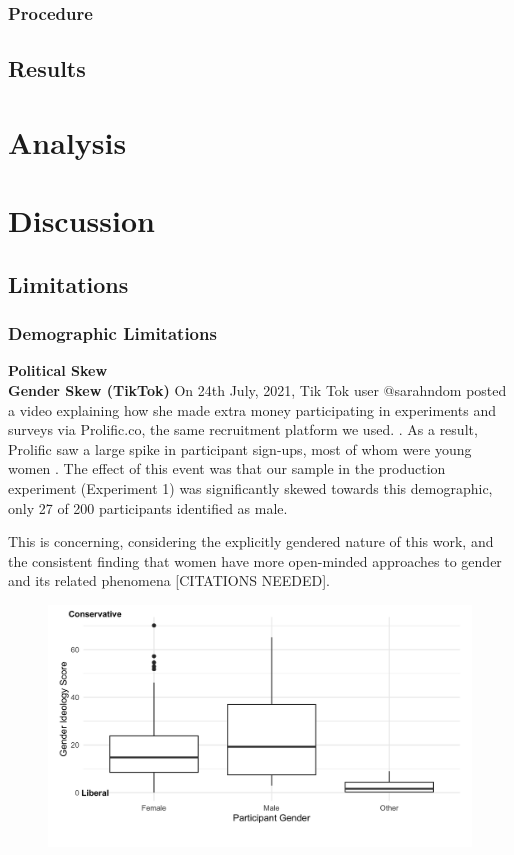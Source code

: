 \documentclass{article}
\begin{document}
	\subsubsection{Procedure}
	
	\subsection{Results}
	
	\newpage
	\section{Analysis}
	
	\newpage
	\section{Discussion}
	
	\subsection{Limitations}
	
	\subsubsection{Demographic Limitations}
	\textbf{Political Skew} \\
	\linebreak
	\textbf{Gender Skew (TikTok)}
	On 24th July, 2021, Tik Tok user @sarahndom posted a video explaining how she made extra money participating in experiments and surveys via Prolific.co, the same recruitment platform we used. \parencite{sarahndom}. As a result, Prolific saw a large spike in participant sign-ups, most of whom were young women \parencite{prolific}. The effect of this event was that our sample in the production experiment (Experiment 1) was significantly skewed towards this demographic, only 27 of 200 participants identified as male.   \par 
	This is concerning, considering the explicitly gendered nature of this work, and the consistent finding that women have more open-minded approaches to gender and its related phenomena [CITATIONS NEEDED]. 
	
	\begin{figure}[h!]
		\centering
		\includegraphics[scale=0.175]{prod_ideo_pure.png}
	\end{figure}
	
\end{document}
